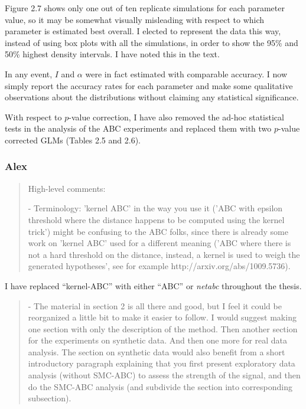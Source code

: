 \documentclass[12pt]{article}
\begin{document}
Figure 2.7 shows only one out of ten replicate simulations for each parameter
value, so it may be somewhat visually misleading with respect to which
parameter is estimated best overall. I elected to represent the data this way,
instead of using box plots with all the simulations, in order to show the 95\%
and 50\% highest density intervals. I have noted this in the text. 

In any event, $I$ and $\alpha$ were in fact estimated with comparable accuracy. 
I now simply report the accuracy rates for each parameter and make some
qualitative observations about the distributions without claiming any
statistical significance.

With respect to $p$-value correction, I have also removed the ad-hoc
statistical tests in the analysis of the ABC experiments and replaced them with
two $p$-value corrected GLMs (Tables 2.5 and 2.6). \\

\subsubsection*{Alex}

\begin{quote}
  \itshape
  
  High-level comments:

  - Terminology: 'kernel ABC' in the way you use it ('ABC with epsilon
  threshold where the distance happens to be computed using the kernel trick')
  might be confusing to the ABC folks, since there is already some work on
  'kernel ABC' used for a different meaning ('ABC where there is not a hard
  threshold on the distance, instead, a kernel is used to weigh the generated
  hypotheses', see for example http://arxiv.org/abs/1009.5736). 
\end{quote}

I have replaced ``kernel-ABC'' with either ``ABC'' or \textit{netabc}
throughout the thesis.

\begin{quote}
  \itshape

  - The material in section 2 is all there and good, but I feel it could be
  reorganized a little bit to make it easier to follow. I would suggest making
  one section with only the description of the method. Then another section for
  the experiments on synthetic data. And then one more for real data analysis.
  The section on synthetic data would also benefit from a short introductory
  paragraph explaining that you first present exploratory data analysis
  (without SMC-ABC) to assess the strength of the signal, and then do the
  SMC-ABC analysis (and subdivide the section into corresponding subsection). 
\end{quote}
\end{document}
